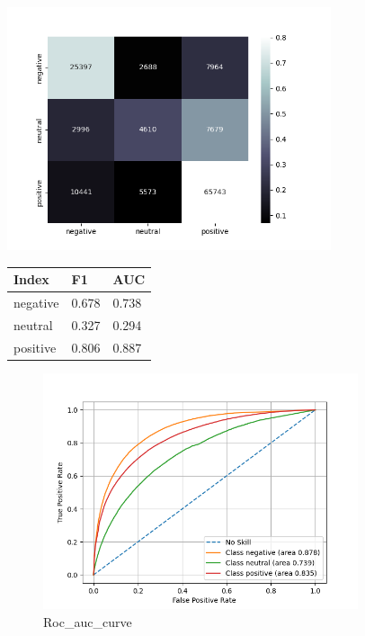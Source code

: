 \documentclass{article}%
\begin{document}
{\begin{minipage}[c]{0.95\textwidth}
\begin{minipage}{0.55\textwidth}
\end{minipage}%
\end{minipage}%
\linebreak%
\begin{minipage}{0.7\textwidth}%
\begin{minipage}{0.8\textwidth}%
\includegraphics[width=360px]{./report/Learning/SGD_Classifier/confusion-matrix.png}%
\end{minipage}%
\begin{minipage}{0.5\textwidth}%
\begin{tabu}[t]{X[r] | X[r] X[r]}%
\hline%
\textbf{Index}&\textbf{F1}&\textbf{AUC}\\%
\hline%
negative&0.678&0.738\\%
neutral&0.327&0.294\\%
positive&0.806&0.887\\%
\end{tabu}%
\end{minipage}%
\end{minipage}%


\begin{figure}[h!]%
\centering%
\includegraphics[width=350px]{./report/Learning/SGD_Classifier/True-Positive-Rate.png}%
\caption{Roc\_auc\_curve}%
\end{figure}

}
\end{document}
